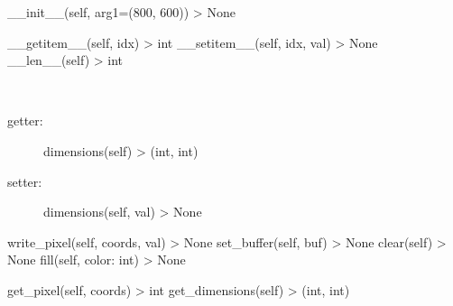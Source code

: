 \documentclass[letterpaper,10pt,english]{sphinxmanual}
\begin{document}
\begin{fulllineitems}
\begin{quote}
\begin{description}
\end{description}\end{quote}


\begin{fulllineitems}
\sphinxAtStartPar
\_\_init\_\_(self, arg1=(800, 600)) \sphinxhyphen{}\textgreater{} None

\end{fulllineitems}



\begin{fulllineitems}
\sphinxAtStartPar
\_\_getitem\_\_(self, idx) \sphinxhyphen{}\textgreater{} int
\_\_setitem\_\_(self, idx, val) \sphinxhyphen{}\textgreater{} None
\_\_len\_\_(self) \sphinxhyphen{}\textgreater{} int

\end{fulllineitems}



\begin{fulllineitems}
~\begin{description}
\item[{getter:}] \leavevmode
\sphinxAtStartPar
dimensions(self) \sphinxhyphen{}\textgreater{} (int, int)

\item[{setter:}] \leavevmode
\sphinxAtStartPar
dimensions(self, val) \sphinxhyphen{}\textgreater{} None

\end{description}

\end{fulllineitems}



\begin{fulllineitems}
\sphinxAtStartPar
write\_pixel(self, coords, val) \sphinxhyphen{}\textgreater{} None
set\_buffer(self, buf) \sphinxhyphen{}\textgreater{} None
clear(self) \sphinxhyphen{}\textgreater{} None
fill(self, color: int) \sphinxhyphen{}\textgreater{} None

\end{fulllineitems}



\begin{fulllineitems}
\sphinxAtStartPar
get\_pixel(self, coords) \sphinxhyphen{}\textgreater{} int
get\_dimensions(self) \sphinxhyphen{}\textgreater{} (int, int)


\end{fulllineitems}
\end{fulllineitems}
\end{document}
